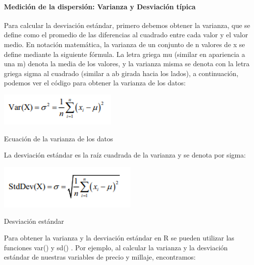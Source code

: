 \documentclass[
  letterpaper,
  DIV=11,
  numbers=noendperiod]{scrartcl}
\let\oldparagraph\paragraph
\renewcommand{\paragraph}[1]{\oldparagraph{#1}\mbox{}}
\begin{document}
\hypertarget{mediciuxf3n-de-la-dispersiuxf3n-varianza-y-desviaciuxf3n-tuxedpica}{%
\paragraph{\texorpdfstring{\textbf{Medición de la dispersión: Varianza y
Desviación
típica}}{Medición de la dispersión: Varianza y Desviación típica}}\label{mediciuxf3n-de-la-dispersiuxf3n-varianza-y-desviaciuxf3n-tuxedpica}}

Para calcular la desviación estándar, primero debemos obtener la
varianza, que se define como el promedio de las diferencias al cuadrado
entre cada valor y el valor medio. En notación matemática, la varianza
de un conjunto de n valores de x se define mediante la siguiente
fórmula. La letra griega mu (similar en apariencia a una m) denota la
media de los valores, y la varianza misma se denota con la letra griega
sigma al cuadrado (similar a ab girada hacia los lados), a continuación,
podemos ver el código para obtener la varianza de los datos:

\begin{Ecuación de la varianza de los datos}

{\centering \includegraphics{f1.png}

}

\caption{Ecuación de la varianza de los datos}

\end{Ecuación de la varianza de los datos}

La desviación estándar es la raíz cuadrada de la varianza y se denota
por sigma:

\begin{Desviación estándar}

{\centering \includegraphics{f2.png}

}

\caption{Desviación estándar}

\end{Desviación estándar}

Para obtener la varianza y la desviación estándar en R se pueden
utilizar las funciones var() y sd() . Por ejemplo, al calcular la
varianza y la desviación estándar de nuestras variables de precio y
millaje, encontramos:
\end{document}
